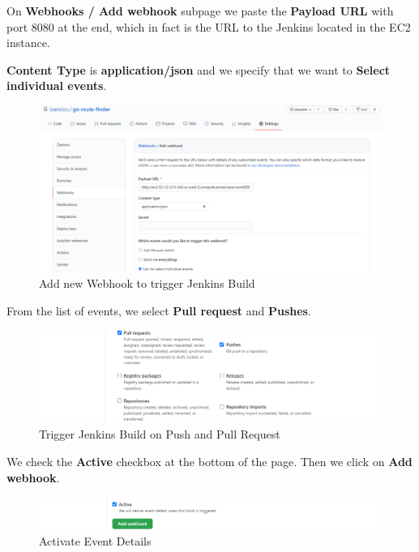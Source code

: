 \documentclass[12pt,a4paper,twoside]{article}
\begin{document}
On \textbf{Webhooks / Add webhook} subpage we paste the \textbf{Payload URL}  with port 8080 at the end, which in fact is the URL to the Jenkins located in the EC2 instance.


\textbf{Content Type} is \textbf{application/json} and we specify that we want to \textbf{Select individual events}.


\begin{figure}[H]
    \centering
        \includegraphics[width=15cm]{images-aws/42-web-hook-setup.png}
        \caption{Add new Webhook to trigger Jenkins Build}
\end{figure}


From the list of events, we select \textbf{Pull request} and \textbf{Pushes}.


\begin{figure}[H]
    \centering
        \includegraphics[width=13cm]{images-aws/43-web-hook-setup-pull.png}
        \caption{Trigger Jenkins Build on Push and Pull Request}
\end{figure}

 We check the \textbf{Active} checkbox at the bottom of the page. Then we click on \textbf{Add webhook}.

\begin{figure}[H]
    \centering
        \includegraphics[width=13cm]{images-aws/44-web-hook-setup-activate.png}
        \caption{Activate Event Details}
\end{figure}
\end{document}
